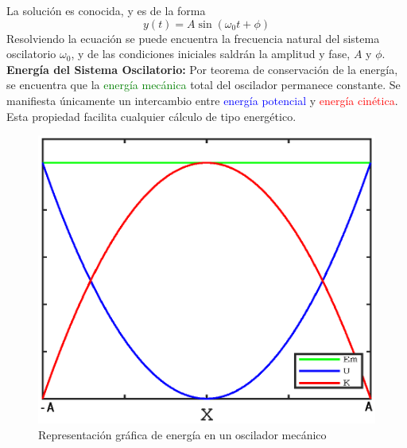 \documentclass[12pt,a4paper]{article}
\begin{document}
La solución es conocida, y es de la forma 
$$y(t) = A \sin\left(\omega_0t+\phi\right)$$
Resolviendo la ecuación se puede encuentra la frecuencia natural del sistema oscilatorio $\omega_0$, y de las condiciones iniciales saldrán la amplitud y fase, $A$ y $\phi$. \\

\textbf{Energía del Sistema Oscilatorio:} Por teorema de conservación de la energía, se encuentra que la \textcolor{green}{energía mecánica} total del oscilador permanece constante. Se manifiesta únicamente un intercambio entre \textcolor{blue}{energía potencial} y \textcolor{red}{energía cinética}. Esta propiedad facilita cualquier cálculo de tipo energético.   

\begin{figure}[htbp]
	\begin{center}
		\includegraphics[scale=0.75]{energOscil.eps}
		\caption{Representación gráfica de energía en un oscilador mecánico}
		\label{fig:energOscil}
	\end{center}
\end{figure}
\end{document}
